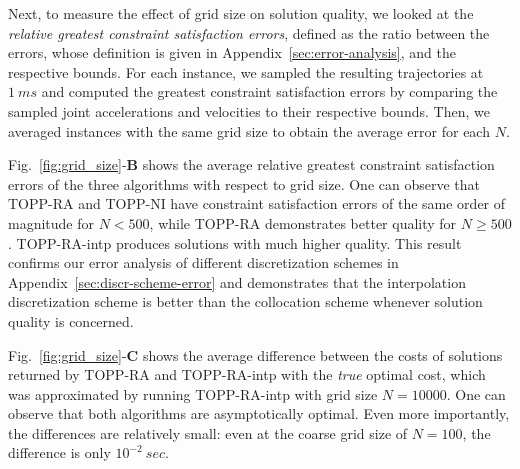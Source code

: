 \documentclass[journal]{IEEEtran}
\theoremstyle{plain}
\theoremstyle{definition}
\theoremstyle{definition}
\begin{document}

Next, to measure the effect of grid size on solution quality, we
looked at the \emph{relative greatest constraint satisfaction errors},
defined as the ratio between the errors, whose definition is given in
Appendix~\ref{sec:error-analysis}, and the respective bounds. For each
instance, we sampled the resulting trajectories at $\SI{1}{ms}$ and
computed the greatest constraint satisfaction errors by comparing the
sampled joint accelerations and velocities to their respective
bounds. Then, we averaged instances with the same grid size to obtain
the average error for each $N$.

Fig.~\ref{fig:grid_size}-\textbf{B} shows the average relative
greatest constraint satisfaction errors of the three algorithms with
respect to grid size. One can observe that TOPP-RA and TOPP-NI have
constraint satisfaction errors of the same order of magnitude for
$N < 500$, while TOPP-RA demonstrates better quality for $N \geq 500$.
TOPP-RA-intp produces solutions with much higher quality. This result
confirms our error analysis of different discretization schemes in
Appendix~\ref{sec:discr-scheme-error} and demonstrates that the
interpolation discretization scheme is better than the collocation
scheme whenever solution quality is concerned.

Fig.~\ref{fig:grid_size}-\textbf{C} shows the average difference
between the costs of solutions returned by TOPP-RA and TOPP-RA-intp
with the \emph{true} optimal cost, which was  approximated by
running TOPP-RA-intp with grid size $N=10000$. One can observe
that both algorithms are asymptotically optimal. Even more
importantly, the differences are relatively small: even at the coarse grid
size of $N=100$, the difference is only $10^{-2}\SI{}{sec}$.
\end{document}
